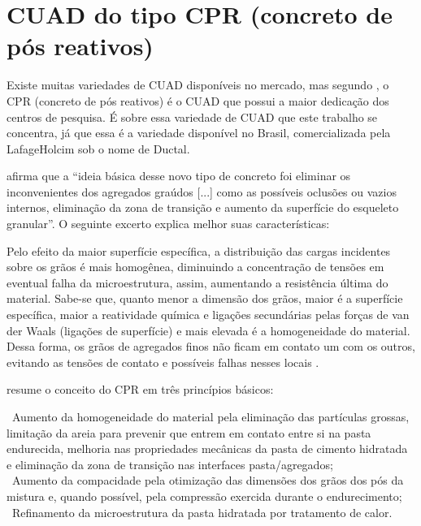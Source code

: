 


\section{CUAD do tipo CPR (concreto de pós reativos)}

Existe muitas variedades de CUAD disponíveis no mercado, mas segundo , o CPR (concreto de pós reativos) é o CUAD que possui a maior dedicação dos centros de pesquisa. É sobre essa variedade de CUAD que este trabalho se concentra, já que essa é a variedade disponível no Brasil, comercializada pela LafageHolcim sob o nome de Ductal\textsuperscript{\textregistered}.

 afirma que a “ideia básica desse novo tipo de concreto foi eliminar os inconvenientes dos agregados graúdos [...] como as possíveis oclusões ou vazios internos, eliminação da zona de transição e aumento da superfície do esqueleto granular”. O seguinte excerto explica melhor suas características:

\begin{citacao}
Pelo efeito da maior superfície específica, a distribuição das cargas incidentes sobre os grãos é mais homogênea, diminuindo a concentração de tensões em eventual falha da microestrutura, assim, aumentando a resistência última do material. Sabe-se que, quanto menor a dimensão dos grãos, maior é a superfície específica, maior a reatividade química e ligações secundárias pelas forças de van der Waals (ligações de superfície) e mais elevada é a homogeneidade do material. Dessa forma, os grãos de agregados finos não ficam em contato um com os outros, evitando as tensões de contato e possíveis falhas nesses locais \cite[p.~1312]{Tutikian}.
\end{citacao}

 resume o conceito do CPR em três princípios básicos:

\begin{citacao}
\textbullet~Aumento da homogeneidade do material pela eliminação das partículas grossas, limitação da areia para prevenir que entrem em contato entre si na pasta endurecida, melhoria nas propriedades mecânicas da pasta de cimento hidratada e eliminação da zona de transição nas interfaces pasta/agregados;\\
\textbullet~Aumento da compacidade pela otimização das dimensões dos grãos dos pós da mistura e, quando possível, pela compressão exercida durante o endurecimento;\\
\textbullet~Refinamento da microestrutura da pasta hidratada por tratamento de calor.
\end{citacao}

